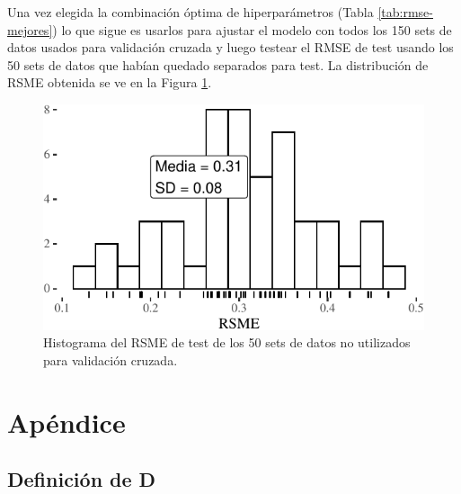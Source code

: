 \documentclass[]{tufte-handout}
\begin{document}
Una vez elegida la combinación óptima de hiperparámetros (Tabla \ref{tab:rmse-mejores}) lo que sigue es usarlos para ajustar el modelo con todos los 150 sets de datos usados para validación cruzada y luego testear el RMSE de test usando los 50 sets de datos que habían quedado separados para test. La distribución de RSME obtenida se ve en la Figura \ref{fig:rmse-test}.

\begin{figure}
\includegraphics{TP-Labo-1_files/figure-latex/rmse-test-1} \caption[Histograma del RSME de test de los 50 sets de datos no utilizados para validación cruzada]{Histograma del RSME de test de los 50 sets de datos no utilizados para validación cruzada.}\label{fig:rmse-test}
\end{figure}

\newpage

\hypertarget{apuxe9ndice}{%
\section{Apéndice}\label{apuxe9ndice}}

\hypertarget{def-d}{%
\subsection{Definición de D}\label{def-d}}
\end{document}
